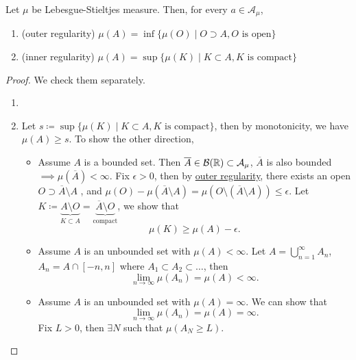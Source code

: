 \begin{theorem}
	Let \(\mu\) be Lebesgue-Stieltjes measure. Then, for every \(a\in \mathcal{A} _\mu \),
	\begin{enumerate}
		\item\label{thm:outer-regularity} (outer regularity) \(\mu (A) = \inf \{\mu (O) \mid O\supset A, O\text{ is open}\}\)
		\item\label{thm:inner-regularity} (inner regularity) \(\mu (A) = \sup \{\mu (K) \mid K\subset A, K\text{ is compact} \}\)
	\end{enumerate}
\end{theorem}
\begin{proof}
	We check them separately.
	\begin{enumerate}
		\item {}
		\item Let \(s \coloneqq \sup \{\mu (K) \mid K\subset A, K\text{ is compact} \}\), then by monotonicity, we have \(\mu (A)\geq s\).
		      To show the other direction,
		      \begin{itemize}
			      \item Assume \(A\) is a bounded set. Then \(\overline{A} \in \mathcal{B} (\mathbb{\MakeUppercase{r}} )\subset \mathcal{A} _\mu \),
			            \(\overline{A} \) is also bounded \(\implies \mu (\overline{A} ) < \infty \). Fix \(\epsilon >0\), then by \hyperref[thm:outer-regularity]{outer regularity},
			            there exists an open \(O\supset \overline{A} \setminus A\) , and \(\mu (O) - \mu (\overline{A} \setminus A) = \mu (O\setminus (\overline{A} \setminus A))\leq \epsilon \).
			            Let \(K\coloneqq \underbrace{A\setminus O}_{K\subset A} = \underbrace{\overline{A} \setminus O}_{\text{compact}}\), we show that
			            \[
				            \mu (K)\geq \mu (A) - \epsilon .
			            \]
			      \item Assume \(A\) is an unbounded set with \(\mu (A)<\infty \). Let \(A = \bigcup\limits_{n=1}^{\infty} A_{n}\), \(A_{n} = A\cap [-n, n]\) where
			            \(A_1\subset A_2\subset \ldots  \), then
			            \[
				            \lim\limits_{n \to \infty} \mu (A_{n}) = \mu (A) < \infty .
			            \]
			            \begin{figure}[H]
				            \centering
				            \caption{}
				            \label{fig:pf:inner-regularity-unbounded}
			            \end{figure}
			      \item Assume \(A\) is an unbounded set with \(\mu (A) = \infty \). We can show that
			            \[
				            \lim\limits_{n \to \infty} \mu (A_{n}) = \mu (A) = \infty.
			            \]
			            Fix \(L>0\), then \(\exists N\) such that \(\mu (A_{N}\geq L)\).
		      \end{itemize}
	\end{enumerate}
\end{proof}

